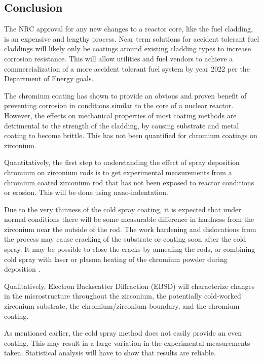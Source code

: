 \documentclass{article}
\begin{document}
\subsection*{Conclusion}
The NRC approval for any new changes to a reactor core, like the fuel cladding, is an expensive and lengthy process.  Near term solutions for accident tolerant fuel claddings will likely only be coatings around existing cladding types to increase corrosion resistance.  This will allow utilities and fuel vendors to achieve a commercialization of a more accident tolerant fuel system by year 2022 per the Department of Energy goals.  

The chromium coating has shown to provide an obvious and proven benefit of preventing corrosion in conditions similar to the core of a nuclear reactor\cite{conference}.  However, the effects on mechanical properties of most coating methods are detrimental to the strength of the cladding, by causing substrate and metal coating to become brittle\cite{highvelmicro}. This has not been quantified for chromium coatings on zirconium.  

Quantitatively, the first step to understanding the effect of spray deposition chromium on zirconium rods is to get experimental measurements from a chromium coated zirconium rod that has not been exposed to reactor conditions or erosion.  This will be done using nano-indentation.

Due to the very thinness of the cold spray coating, it is expected that under normal conditions there will be some measurable difference in hardness from the zirconium near the outside of the rod.  The work hardening and dislocations from the process may cause cracking of the substrate or coating soon after the cold spray.  It may be possible to close the cracks by annealing the rods, or combining cold spray with laser or plasma heating of the chromium powder during deposition \cite{highvelmicro}.

Qualitatively, Electron Backscatter Diffraction (EBSD) will characterize changes in the microstructure throughout the zirconium, the potentially cold-worked zirconium substrate, the chromium/zirconium boundary, and the chromium coating.  

As mentioned earlier, the cold spray method does not easily provide an even coating.  This may result in a large variation in the experimental measurements taken.  Statistical analysis will have to show that results are reliable.

\nocite{*}


\end{document}
